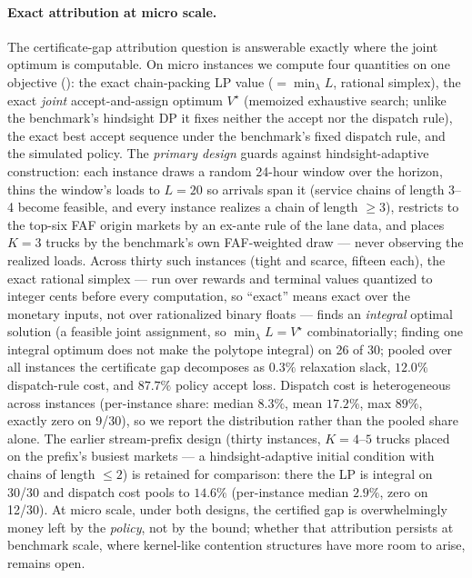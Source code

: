 \documentclass[11pt]{article}
\newcommand{\Vstar}{V^{\star}}
\begin{document}
\paragraph{Exact attribution at micro scale.} The certificate-gap
attribution question is answerable exactly where the joint optimum is
computable. On micro instances we compute four quantities on one
objective (): the exact
chain-packing LP value ($= \min_{\lambda} L$, rational simplex), the
exact \emph{joint} accept-and-assign optimum $\Vstar$ (memoized
exhaustive search; unlike the benchmark's hindsight DP it fixes
neither the accept nor the dispatch rule), the exact best accept
sequence under the benchmark's fixed dispatch rule, and the simulated
policy. The \emph{primary design} guards against hindsight-adaptive
construction: each instance draws a random 24-hour window over the
horizon, thins the window's loads to $L = 20$ so arrivals span it
(service chains of length 3--4 become feasible, and every instance
realizes a chain of length $\geq 3$), restricts to the top-six FAF
origin markets by an ex-ante rule of the lane data, and places $K = 3$
trucks by the benchmark's own FAF-weighted draw --- never observing
the realized loads. Across thirty such instances (tight and scarce,
fifteen each), the exact rational simplex --- run over rewards and
terminal values quantized to integer cents before every computation,
so ``exact'' means exact over the monetary inputs, not over
rationalized binary floats --- finds an \emph{integral}
optimal solution (a feasible joint assignment, so
$\min_{\lambda} L = \Vstar$ combinatorially; finding one integral
optimum does not make the polytope integral) on 26 of 30; pooled over all instances the
certificate gap decomposes as $0.3\%$ relaxation slack, $12.0\%$
dispatch-rule cost, and $87.7\%$ policy accept loss. Dispatch cost is
heterogeneous across instances (per-instance share: median $8.3\%$,
mean $17.2\%$, max $89\%$, exactly zero on 9/30), so we report the
distribution rather than the pooled share alone. The earlier
stream-prefix design (thirty instances, $K = 4$--$5$ trucks placed on
the prefix's busiest markets --- a hindsight-adaptive initial
condition with chains of length $\leq 2$) is retained for comparison:
there the LP is integral on 30/30 and dispatch cost pools to $14.6\%$
(per-instance median $2.9\%$, zero on 12/30). At micro scale, under
both designs, the certified gap is overwhelmingly money left by the
\emph{policy}, not by the bound; whether that attribution persists at
benchmark scale, where kernel-like contention structures have more
room to arise, remains open.
\end{document}
